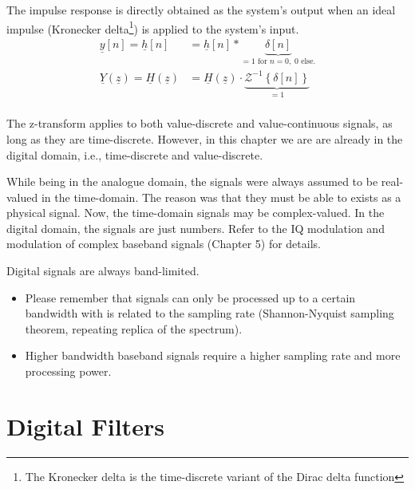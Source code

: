 \begin{refsection}
The impulse response is directly obtained as the system's output when an ideal impulse (Kronecker delta\footnote{The Kronecker delta is the time-discrete variant of the Dirac delta function}) is applied to the system's input.
\begin{equation}
	\begin{split}
		\underline{y}[n] = \underline{h}[n] &= \underline{h}[n] * \underbrace{\delta[n]}_{= 1 \text{ for } n=0, \; 0 \text{ else}.} \\
		\underline{Y}(\underline{z}) = \underline{H}(\underline{z}) &= \underline{H}(\underline{z}) \cdot \underbrace{\mathcal{Z}^{-1}\left\{\delta[n]\right\}}_{=1} \\
	\end{split}
\end{equation}

\begin{remark}
	The z-transform applies to both value-discrete and value-continuous signals, as long as they are time-discrete. However, in this chapter we are are already in the digital domain, i.e., time-discrete and value-discrete.
\end{remark}

\begin{remark}
	While being in the analogue domain, the signals were always assumed to be real-valued in the time-domain. The reason was that they must be able to exists as a physical signal. Now, the time-domain signals may be complex-valued. In the digital domain, the signals are just numbers. Refer to the IQ modulation and modulation of complex baseband signals (Chapter 5) for details.
\end{remark}

\begin{remark}
	Digital signals are always band-limited.
	\begin{itemize}
		\item Please remember that signals can only be processed up to a certain bandwidth with is related to the sampling rate (Shannon-Nyquist sampling theorem, repeating replica of the spectrum).
		\item Higher bandwidth baseband signals require a higher sampling rate and more processing power.
	\end{itemize}
\end{remark}

\section{Digital Filters}


\end{refsection}
